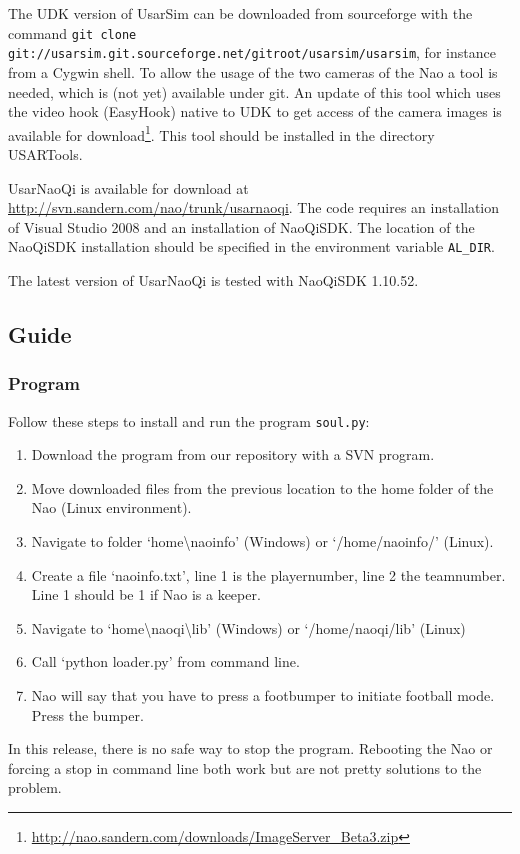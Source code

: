 \documentclass[a4paper]{article}
\begin{document}
The UDK version of UsarSim can be downloaded from sourceforge with the command \texttt{git clone git://usarsim.git.sourceforge.net/gitroot/usarsim/usarsim}, for instance from a Cygwin shell. To allow the usage of the two cameras of the Nao a tool is needed, which is (not yet) available
under git. An update of this tool which uses the video hook (EasyHook) native to UDK to get access of the camera images is available for download\footnote{\url{http://nao.sandern.com/downloads/ImageServer_Beta3.zip}}. This tool should be installed in the directory USARTools.

UsarNaoQi is available for download at \url{http://svn.sandern.com/nao/trunk/usarnaoqi}. The code requires an installation of Visual Studio 2008 and an installation of NaoQiSDK. The location of the NaoQiSDK installation should be specified in the environment variable \texttt{AL\_DIR}.

The latest version of UsarNaoQi is tested with NaoQiSDK 1.10.52.

\subsection{Guide}
\subsubsection{Program}
Follow these steps to install and run the program \texttt{soul.py}:
\begin{enumerate}
\item Download the program from our repository with a SVN program.
\item Move downloaded files from the previous location to the home folder of the Nao (Linux environment).
\item Navigate to folder `home\textbackslash naoinfo' (Windows) or `/home/naoinfo/' (Linux). 
\item Create a file `naoinfo.txt', line 1 is the playernumber, line 2 the teamnumber. Line 1 should be 1 if Nao is a keeper.
\item Navigate to `home\textbackslash naoqi\textbackslash lib' (Windows) or `/home/naoqi/lib' (Linux)
\item Call `python loader.py' from command line.
\item Nao will say that you have to press a footbumper to initiate football mode. Press the bumper.
\end{enumerate}
In this release, there is no safe way to stop the program. Rebooting the Nao or forcing a stop in command line both work but are not pretty solutions to the problem.
\end{document}
